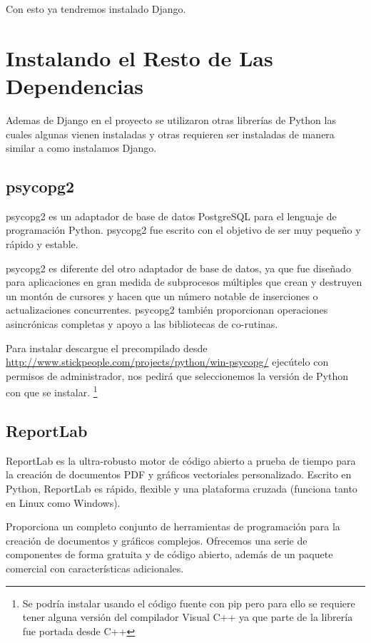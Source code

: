 Con esto ya tendremos instalado Django.

\section{Instalando el Resto de Las Dependencias}

Ademas de Django en el proyecto se utilizaron otras librerías de Python las cuales algunas vienen instaladas y otras requieren ser instaladas de manera similar a como instalamos Django.

\subsection{psycopg2}

psycopg2 es un adaptador de base de datos PostgreSQL para el lenguaje de programación Python. psycopg2 fue escrito con el objetivo de ser muy pequeño y rápido y estable. 

psycopg2 es diferente del otro adaptador de base de datos, ya que fue diseñado para aplicaciones en gran medida de subprocesos múltiples que crean y destruyen un montón de cursores y hacen que un número notable de inserciones o actualizaciones concurrentes. psycopg2 también proporcionan operaciones asincrónicas completas y apoyo a las bibliotecas de co-rutinas. 

Para instalar descargue el precompilado desde \url{http://www.stickpeople.com/projects/python/win-psycopg/} ejecútelo con permisos de administrador, nos pedirá que seleccionemos la versión de Python con que se instalar. \footnote{Se podría instalar usando el código fuente con pip pero para ello se requiere tener alguna versión del compilador Visual C++ ya que parte de la librería fue portada desde C++}

\subsection{ReportLab}

ReportLab es la ultra-robusto motor de código abierto a prueba de tiempo para la creación de documentos PDF y gráficos vectoriales personalizado. Escrito en Python, ReportLab es rápido, flexible y una plataforma cruzada (funciona tanto en Linux como Windows).
 
Proporciona un completo conjunto de herramientas de programación para la creación de documentos y gráficos complejos. Ofrecemos una serie de componentes de forma gratuita y de código abierto, además de un paquete comercial con características adicionales.

